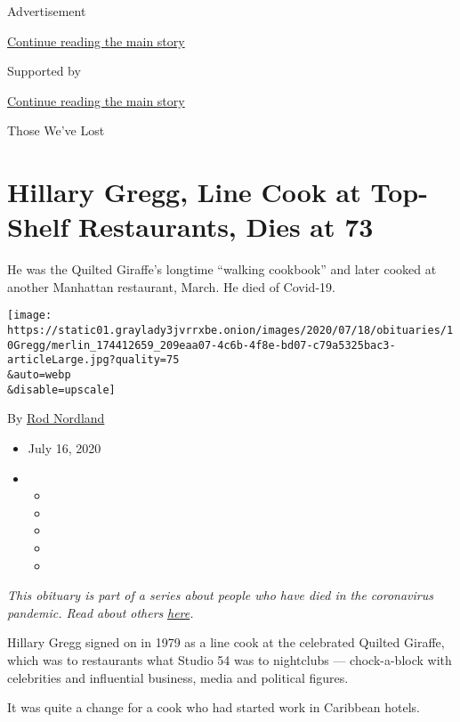 Advertisement

\protect\hyperlink{after-top}{Continue reading the main story}

Supported by

\protect\hyperlink{after-sponsor}{Continue reading the main story}

Those We've Lost

\hypertarget{hillary-gregg-line-cook-at-top-shelf-restaurants-dies-at-73}{%
\section{Hillary Gregg, Line Cook at Top-Shelf Restaurants, Dies at
73}\label{hillary-gregg-line-cook-at-top-shelf-restaurants-dies-at-73}}

He was the Quilted Giraffe's longtime ``walking cookbook'' and later
cooked at another Manhattan restaurant, March. He died of Covid-19.

\texttt{[image: https://static01.graylady3jvrrxbe.onion/images/2020/07/18/obituaries/10Gregg/merlin\_174412659\_209eaa07-4c6b-4f8e-bd07-c79a5325bac3-articleLarge.jpg?quality=75\\\&auto=webp\\\&disable=upscale]}

By \href{https://www.nytimes3xbfgragh.onion/by/rod-nordland}{Rod
Nordland}

\begin{itemize}
\item
  July 16, 2020
\item
  \begin{itemize}
  \item
  \item
  \item
  \item
  \item
  \end{itemize}
\end{itemize}

\emph{This obituary is part of a series about people who have died in
the coronavirus pandemic. Read about others}
\href{https://www.nytimes3xbfgragh.onion/interactive/2020/obituaries/people-died-coronavirus-obituaries.html}{\emph{here}}\emph{.}

Hillary Gregg signed on in 1979 as a line cook at the celebrated Quilted
Giraffe, which was to restaurants what Studio 54 was to nightclubs ---
chock-a-block with celebrities and influential business, media and
political figures.

It was quite a change for a cook who had started work in Caribbean
hotels.

